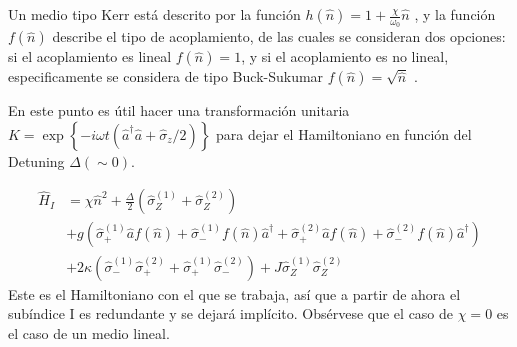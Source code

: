 Un medio tipo Kerr está descrito por la funci\'on $h(\hat n)=1+\frac{\chi}{\omega_0}\hat n$ \cite{Lugiato1987}, y la funci\'on $f(\hat n)$ describe el tipo de acoplamiento, de las cuales se consideran dos opciones: si el acoplamiento es lineal $f(\hat n)=1$, y si el acoplamiento es no lineal, especificamente se considera de tipo Buck-Sukumar $f(\hat n) = \sqrt{\hat n}$ \cite{Buck1980}.

En este punto es útil hacer una transformaci\'on unitaria  $K = \exp\left\{-i \omega t (\hat a^\dagger \hat a + \hat \sigma_z/2)\right\}$ para dejar el Hamiltoniano en funci\'on del Detuning $\Delta (\sim 0)$. 

\begin{equation}
\begin{split}
     \hat H_I & = \chi \hat n^2+\frac{ \Delta}{2}(\hat\sigma_Z^{(1)}+\hat\sigma_Z^{(2)})   \\ 
     & +  g(\hat\sigma_+^{(1)}\hat a f(\hat n)+\hat\sigma_-^{(1)}f(\hat n) \hat a^\dagger + \hat\sigma_+^{(2)}\hat a f(\hat n)+\hat\sigma_-^{(2)}f(\hat n) \hat a^\dagger) \\ 
 & + 2 \kappa (\hat \sigma_-^{(1)}\hat \sigma_+^{(2)}+\hat \sigma_+^{(1)}\hat \sigma_-^{(2)}) +  J \hat \sigma_Z^{(1)}\hat \sigma_Z^{(2)}
\end{split}
\end{equation}\label{ec4:H}
Este es el Hamiltoniano con el que se trabaja, así que a partir de ahora el subíndice I es redundante y se dejará implícito. Obsérvese que el caso de $\chi=0$ es el caso de un medio lineal. 


